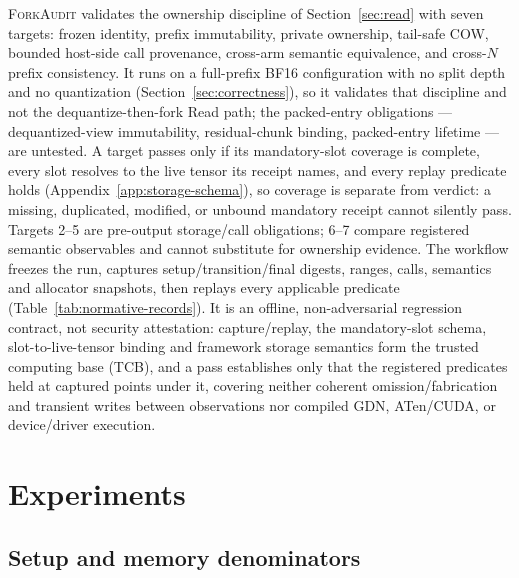 \documentclass{article}
\newcommand{\method}{\textsc{ForkAudit}}
\begin{document}
\method{} validates the ownership discipline of Section~\ref{sec:read} with
seven targets: frozen identity, prefix immutability, private ownership,
tail-safe COW, bounded host-side call provenance, cross-arm semantic
equivalence, and cross-\(N\) prefix consistency. It runs on a full-prefix BF16
configuration with no split depth and no quantization
(Section~\ref{sec:correctness}), so it validates that discipline and not the
dequantize-then-fork Read path; the packed-entry obligations --- dequantized-view
immutability, residual-chunk binding, packed-entry lifetime --- are untested.
A target passes only if its mandatory-slot coverage is complete, every slot
resolves to the live tensor its receipt names, and every replay predicate holds
(Appendix~\ref{app:storage-schema}), so coverage is separate from verdict: a
missing, duplicated, modified, or unbound mandatory receipt cannot silently
pass.  Targets 2--5 are pre-output storage/call obligations; 6--7 compare
registered semantic observables and cannot substitute for ownership evidence.
The workflow freezes the run, captures setup/transition/final digests, ranges,
calls, semantics and allocator snapshots, then replays every applicable predicate
(Table~\ref{tab:normative-records}).  It is an offline, non-adversarial
regression contract, not security attestation: capture/replay, the
mandatory-slot schema, slot-to-live-tensor binding and framework storage
semantics form the trusted computing base (TCB), and a pass establishes only
that the registered predicates held at captured points under it, covering
neither coherent omission/fabrication and transient writes between observations
nor compiled GDN, ATen/CUDA, or device/driver execution.

\section{Experiments}
\label{sec:experiments}
\label{sec:protocol}

\subsection{Setup and memory denominators}
\label{sec:setup}
\end{document}
